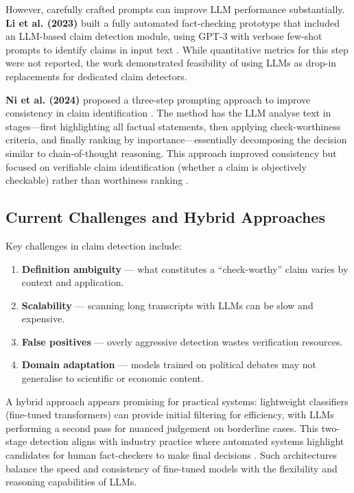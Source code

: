 \documentclass[12pt,a4paper]{article}
\begin{document}
However, carefully crafted prompts can improve LLM performance substantially. \textbf{Li et al. (2023)} built a fully automated fact-checking prototype that included an LLM-based claim detection module, using GPT-3 with verbose few-shot prompts to identify claims in input text \citep{li2023llmclaimdetection}. While quantitative metrics for this step were not reported, the work demonstrated feasibility of using LLMs as drop-in replacements for dedicated claim detectors.

\textbf{Ni et al. (2024)} proposed a three-step prompting approach to improve consistency in claim identification \citep{ni2024threestep}. The method has the LLM analyse text in stages—first highlighting all factual statements, then applying check-worthiness criteria, and finally ranking by importance—essentially decomposing the decision similar to chain-of-thought reasoning. This approach improved consistency but focused on verifiable claim identification (whether a claim is objectively checkable) rather than worthiness ranking \citep{ni2024verifiable}.

\subsection{Current Challenges and Hybrid Approaches}

Key challenges in claim detection include:

\begin{enumerate}
    \item \textbf{Definition ambiguity} — what constitutes a ``check-worthy'' claim varies by context and application.
    \item \textbf{Scalability} — scanning long transcripts with LLMs can be slow and expensive.
    \item \textbf{False positives} — overly aggressive detection wastes verification resources.
    \item \textbf{Domain adaptation} — models trained on political debates may not generalise to scientific or economic content.
\end{enumerate}

A hybrid approach appears promising for practical systems: lightweight classifiers (fine-tuned transformers) can provide initial filtering for efficiency, with LLMs performing a second pass for nuanced judgement on borderline cases. This two-stage detection aligns with industry practice where automated systems highlight candidates for human fact-checkers to make final decisions \citep{hassan2021claimbuster}. Such architectures balance the speed and consistency of fine-tuned models with the flexibility and reasoning capabilities of LLMs.
\end{document}
